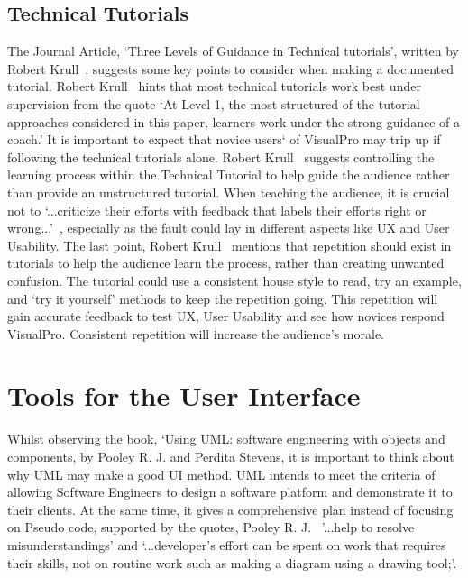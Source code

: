 \documentclass[12pt]{report} %
\begin{document}
		\subsection{Technical Tutorials}
			The Journal Article, `Three Levels of Guidance in Technical tutorials', written by Robert Krull~\cite{krull_three_1997}, suggests some key points to consider when making a documented tutorial. Robert Krull~\cite{krull_three_1997} hints that most technical tutorials work best under supervision from the quote `At Level 1, the most structured of the tutorial approaches considered in this paper, learners work under the strong guidance of a coach.' It is important to expect that novice users` of VisualPro may trip up if following the technical tutorials alone. Robert Krull~\cite{krull_three_1997} suggests controlling the learning process within the Technical Tutorial to help guide the audience rather than provide an unstructured tutorial. When teaching the audience, it is crucial not to `...criticize their efforts with feedback that labels their efforts right or wrong...'~\cite{krull_three_1997}, especially as the fault could lay in different aspects like UX and User Usability. The last point, Robert Krull~\cite{krull_three_1997} mentions that repetition should exist in tutorials to help the audience learn the process, rather than creating unwanted confusion. The tutorial could use a consistent house style to read, try an example, and `try it yourself' methods to keep the repetition going. This repetition will gain accurate feedback to test UX, User Usability and see how novices respond VisualPro. Consistent repetition will increase the audience's morale.

	\section{Tools for the User Interface}  
		Whilst observing the book, `Using UML: software engineering with objects and components, by Pooley R. J. and Perdita Stevens\cite{pooley_r_j_using_2006}, it is important to think about why UML may make a good UI method. UML intends to meet the criteria of allowing Software Engineers to design a software platform and demonstrate it to their clients. At the same time, it gives a comprehensive plan instead of focusing on Pseudo code, supported by the quotes, Pooley R. J.~\cite{pooley_r_j_using_2006} '...help to resolve misunderstandings' and `...developer's effort can be spent on work that requires their skills, not on routine work such as making a diagram using a drawing tool;'.
		
\end{document}
